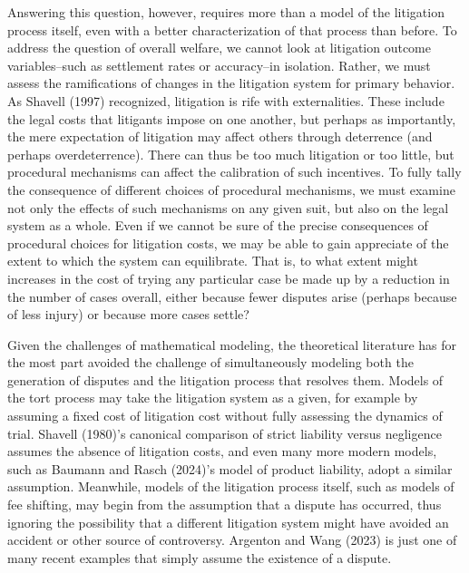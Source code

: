 \documentclass{article}
\begin{document}
Answering this question, however, requires more than a model of the litigation process itself, even with a better characterization of that process than before. To address the question of overall welfare, we cannot look at litigation outcome variables--such as settlement rates or accuracy--in isolation. Rather, we must assess the ramifications of changes in the litigation system for primary behavior. As Shavell (1997) recognized, litigation is rife with externalities. These include the legal costs that litigants impose on one another, but perhaps as importantly, the mere expectation of litigation may affect others through deterrence (and perhaps overdeterrence). There can thus be too much litigation or too little, but procedural mechanisms can affect the calibration of such incentives. To fully tally the consequence of different choices of procedural mechanisms, we must examine not only the effects of such mechanisms on any given suit, but also on the legal system as a whole. Even if we cannot be sure of the precise consequences of procedural choices for litigation costs, we may be able to gain appreciate of the extent to which the system can equilibrate. That is, to what extent might increases in the cost of trying any particular case be made up by a reduction in the number of cases overall, either because fewer disputes arise (perhaps because of less injury) or because more cases settle?

Given the challenges of mathematical modeling, the theoretical literature has for the most part avoided the challenge of simultaneously modeling both the generation of disputes and the litigation process that resolves them. Models of the tort process may take the litigation system as a given, for example by assuming a fixed cost of litigation cost without fully assessing the dynamics of trial. Shavell (1980)'s canonical comparison of strict liability versus negligence assumes the absence of litigation costs, and even many more modern models, such as Baumann and Rasch (2024)'s model of product liability, adopt a similar assumption. Meanwhile, models of the litigation process itself, such as models of fee shifting, may begin from the assumption that a dispute has occurred, thus ignoring the possibility that a different litigation system might have avoided an accident or other source of controversy. Argenton and Wang (2023) is just one of many recent examples that simply assume the existence of a dispute. 
\end{document}
